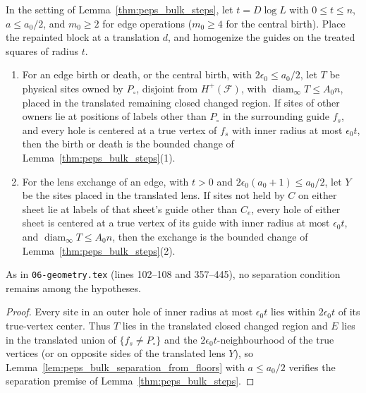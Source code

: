 \begin{lemma}
    \label{thm:peps_bulk_steps_from_floors}
    \leanok
    In the setting of Lemma~\ref{thm:peps_bulk_steps}, let $t=D\log L$ with
    $0\le t\le n$, $a\le a_0/2$, and $m_0\ge2$ for edge operations
    ($m_0\ge4$ for the central birth). Place the repainted block at a
    translation $d$, and homogenize the guides on the treated squares of
    radius $t$.
    \begin{enumerate}
        \item For an edge birth or death, or the central birth, with
              $2\epsilon_0\le a_0/2$, let $T$ be physical sites owned by $P_\circ$,
              disjoint from $H^+(\mathcal F)$, with $\operatorname{diam}_\infty T\le A_0n$, placed in the
              translated remaining closed changed region. If sites of other owners lie at positions of labels other than $P_\circ$ in the surrounding guide $f_s$, and
              every hole is centered at a true vertex of $f_s$ with inner
              radius at most $\epsilon_0t$, then the birth or death is the bounded
              change of Lemma~\ref{thm:peps_bulk_steps}(1).
        \item For the lens exchange of an edge, with $t>0$ and
              $2\epsilon_0(a_0+1)\le a_0/2$, let $Y$ be the sites placed in the translated
              lens. If sites not held by $C$ on either sheet lie at
              labels of that sheet's guide other than $C_e$, every hole of either
              sheet is centered at a true vertex of its guide with inner radius
              at most $\epsilon_0t$, and $\operatorname{diam}_\infty T\le A_0n$, then the
              exchange is the bounded change of
              Lemma~\ref{thm:peps_bulk_steps}(2).
    \end{enumerate}
    As in \texttt{06-geometry.tex} (lines 102--108 and 357--445), no separation
    condition remains among the hypotheses.
\end{lemma}

\begin{proof}\leanok
    Every site in an outer hole of inner radius at most $\epsilon_0t$ lies within $2\epsilon_0t$ of its true-vertex center. Thus $T$ lies in the
    translated closed changed region and $E$ lies in the translated union
    of $\{f_s\ne P_\circ\}$ and the $2\epsilon_0t$-neighbourhood of the true vertices (or on opposite sides of the translated
    lens $Y$), so Lemma~\ref{lem:peps_bulk_separation_from_floors} with $a\le a_0/2$ verifies the separation premise of
    Lemma~\ref{thm:peps_bulk_steps}.
\end{proof}

